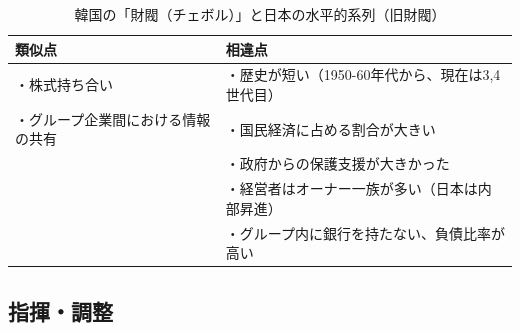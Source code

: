 \documentclass[
]{book}
\begin{document}
\begin{table}

\caption{\label{tab:chaebolkeiretsu}韓国の「財閥（チェボル）」と日本の水平的系列（旧財閥）}
\centering
\begin{tabular}[t]{l|l}
\hline
類似点 & 相違点\\
\hline
・株式持ち合い & ・歴史が短い（1950-60年代から、現在は3,4世代目）\\
\hline
・グループ企業間における情報の共有 & ・国民経済に占める割合が大きい\\
\hline
 & ・政府からの保護支援が大きかった\\
\hline
 & ・経営者はオーナー一族が多い（日本は内部昇進）\\
\hline
 & ・グループ内に銀行を持たない、負債比率が高い\\
\hline
\end{tabular}
\end{table}

\hypertarget{asia-command}{%
\subsection{指揮・調整}\label{asia-command}}
\end{document}

